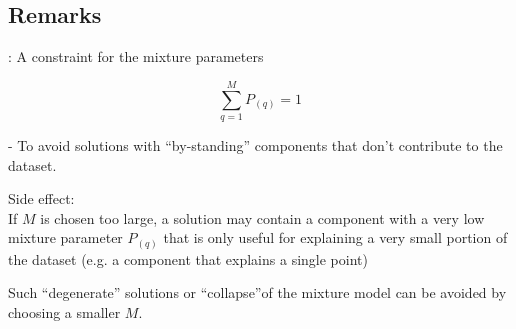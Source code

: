 \subsection{Remarks}

\begin{frame}{\subsecname: A constraint for the mixture parameters}


\begin{equation}
\sum_{q=1}^M P_{(q)} = 1
\end{equation}

\pause

- To avoid solutions with ``by-standing'' components that don't contribute to the dataset.

Side effect:\\

If $M$ is chosen too large, a solution may contain a component with a very low mixture parameter $P_{(q)}$ that is only useful for explaining a very small portion of the dataset (e.g. a component that explains a single point)

Such ``degenerate'' solutions or ``collapse''of the mixture model can be avoided by choosing a smaller $M$.

\end{frame}
